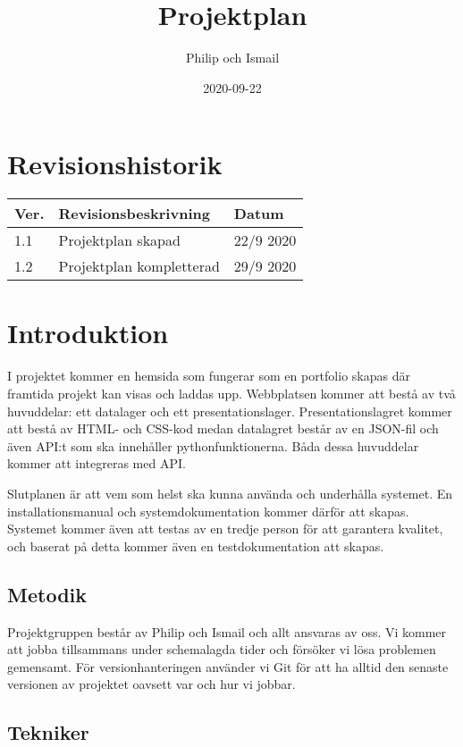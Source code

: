 \documentclass{TDP003mall}
\author{Philip och Ismail}
\title{Projektplan}
\date{2020-09-22}
\begin{document}
\projectpage

\tableofcontents

\newpage

\section{Revisionshistorik}
\begin{table}[!h]
\begin{tabularx}{\linewidth}{|l|X|l|}
\hline
Ver. & Revisionsbeskrivning & Datum \\\hline
1.1 & Projektplan skapad & 22/9 2020 \\\hline
1.2 & Projektplan kompletterad & 29/9 2020 \\\hline
\end{tabularx}
\end{table}


\section{Introduktion}
I projektet kommer en hemsida som fungerar som en portfolio skapas där framtida projekt kan visas och laddas upp. Webbplatsen kommer att bestå av två huvuddelar: ett datalager och ett presentationslager. Presentationslagret kommer att bestå av HTML- och CSS-kod medan datalagret består av en JSON-fil och även API:t som ska innehåller pythonfunktionerna. Båda dessa huvuddelar kommer att integreras med API.

Slutplanen är att vem som helst ska kunna använda och underhålla systemet. En installationsmanual och systemdokumentation kommer därför att skapas. Systemet kommer även att testas av en tredje person för att garantera kvalitet, och baserat på detta kommer även en testdokumentation att skapas.

\subsection{Metodik}

Projektgruppen består av Philip och Ismail och allt ansvaras av oss. Vi kommer att jobba tillsammans under schemalagda tider och försöker vi lösa problemen gemensamt. För versionhanteringen använder vi Git för att ha alltid den senaste versionen av projektet oavsett var och hur vi jobbar.

\subsection{Tekniker}
\end{document}

